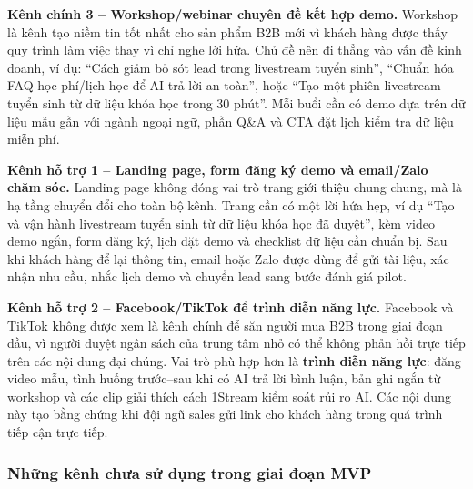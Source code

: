 \textbf{Kênh chính 3 -- Workshop/webinar chuyên đề kết hợp demo.}
Workshop là kênh tạo niềm tin tốt nhất cho sản phẩm B2B mới vì khách hàng được
thấy quy trình làm việc thay vì chỉ nghe lời hứa. Chủ đề nên đi thẳng vào vấn đề
kinh doanh, ví dụ: ``Cách giảm bỏ sót lead trong livestream tuyển sinh'', ``Chuẩn
hóa FAQ học phí/lịch học để AI trả lời an toàn'', hoặc ``Tạo một phiên livestream
tuyển sinh từ dữ liệu khóa học trong 30 phút''. Mỗi buổi cần có demo dựa trên dữ
liệu mẫu gần với ngành ngoại ngữ, phần Q\&A và CTA đặt lịch kiểm tra dữ liệu miễn
phí.

\textbf{Kênh hỗ trợ 1 -- Landing page, form đăng ký demo và email/Zalo chăm sóc.}
Landing page không đóng vai trò trang giới thiệu chung chung, mà là hạ tầng
chuyển đổi cho toàn bộ kênh. Trang cần có một lời hứa hẹp, ví dụ ``Tạo và vận
hành livestream tuyển sinh từ dữ liệu khóa học đã duyệt'', kèm video demo ngắn,
form đăng ký, lịch đặt demo và checklist dữ liệu cần chuẩn bị. Sau khi khách hàng
để lại thông tin, email hoặc Zalo được dùng để gửi tài liệu, xác nhận nhu cầu,
nhắc lịch demo và chuyển lead sang bước đánh giá pilot.

\textbf{Kênh hỗ trợ 2 -- Facebook/TikTok để trình diễn năng lực.}
Facebook và TikTok không được xem là kênh chính để săn người mua B2B trong giai
đoạn đầu, vì người duyệt ngân sách của trung tâm nhỏ có thể không phản hồi trực
tiếp trên các nội dung đại chúng. Vai trò phù hợp hơn là \textbf{trình diễn năng
lực}: đăng video mẫu, tình huống trước--sau khi có AI trả lời bình luận, bản ghi
ngắn từ workshop và các clip giải thích cách 1Stream kiểm soát rủi ro AI. Các nội
dung này tạo bằng chứng khi đội ngũ sales gửi link cho khách hàng trong quá trình
tiếp cận trực tiếp.

\subsubsection{Những kênh chưa sử dụng trong giai đoạn MVP}

